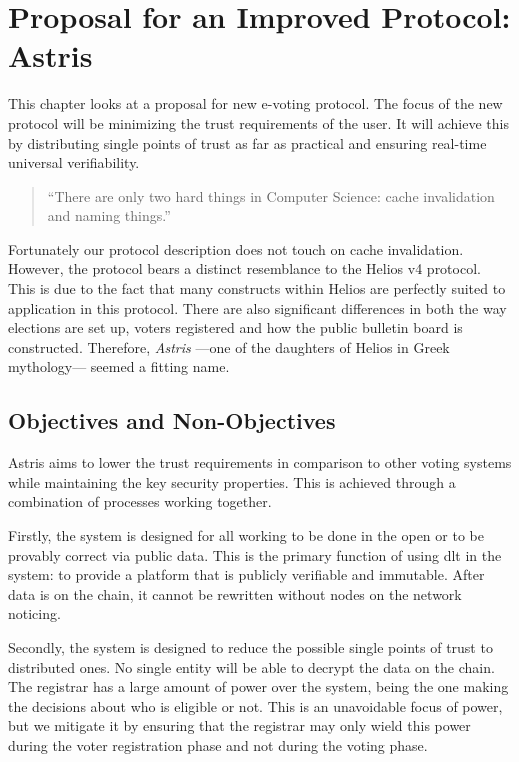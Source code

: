 
\chapter{Proposal for an Improved Protocol: Astris}
\label{ch:astris}

This chapter looks at a proposal for new e-voting protocol. The focus of the new protocol will be minimizing the trust requirements of the user. It will achieve this by distributing single points of trust as far as practical and ensuring real-time universal verifiability.

\begin{quote}
    ``There are only two hard things in Computer Science: cache invalidation and naming things.''

\end{quote}

Fortunately our protocol description does not touch on cache invalidation. However, the protocol bears a distinct resemblance to the Helios v4 protocol. This is due to the fact that many constructs within Helios are perfectly suited to application in this protocol. There are also significant differences in both the way elections are set up, voters registered and how the public bulletin board is constructed. Therefore, \emph{Astris} ---one of the daughters of Helios in Greek mythology--- seemed a fitting name.

\section{Objectives and Non-Objectives}
\label{ch:astris:aims}

Astris aims to lower the trust requirements in comparison to other voting systems while maintaining the key security properties. This is achieved through a combination of processes working together.

Firstly, the system is designed for all working to be done in the open or to be provably correct via public data. This is the primary function of using \gls{dlt} in the system: to provide a platform that is publicly verifiable and immutable. After data is on the chain, it cannot be rewritten without nodes on the network noticing.

Secondly, the system is designed to reduce the possible single points of trust to distributed ones. No single entity will be able to decrypt the data on the chain. The registrar has a large amount of power over the system, being the one making the decisions about who is eligible or not. This is an unavoidable focus of power, but we mitigate it by ensuring that the registrar may only wield this power during the voter registration phase and not during the voting phase.


